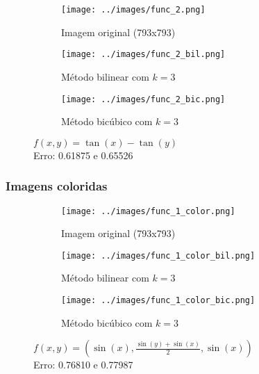 \documentclass[leqno]{article}
\begin{document}
\begin{figure}[H]
    \centering
    \begin{subfigure}{.33\textwidth}
      \centering
      \texttt{[image: ../images/func\_2.png]}
      \caption{Imagem original  (793x793) }
      \label{fig:sub1}
    \end{subfigure}%
    \begin{subfigure}{.33\textwidth}
      \centering
      \texttt{[image: ../images/func\_2\_bil.png]}
      \caption{Método bilinear com $k = 3$}
      \label{fig:sub2}
    \end{subfigure}
    \begin{subfigure}{.33\textwidth}
        \centering
        \texttt{[image: ../images/func\_2\_bic.png]}
        \caption{Método bicúbico com $k = 3$}
        \label{fig:sub1}
      \end{subfigure}%
    \caption{$f(x,y) = \tan(x) - \tan(y)$ \\ Erro: 0.61875 e 0.65526}
    \label{fig:test}
\end{figure}

\subsubsection*{Imagens coloridas}

\begin{figure}[H]
    \centering
    \begin{subfigure}{.33\textwidth}
      \centering
      \texttt{[image: ../images/func\_1\_color.png]}
      \caption{Imagem original  (793x793) }
      \label{fig:sub1}
    \end{subfigure}%
    \begin{subfigure}{.33\textwidth}
      \centering
      \texttt{[image: ../images/func\_1\_color\_bil.png]}
      \caption{Método bilinear com $k = 3$}
      \label{fig:sub2}
    \end{subfigure}
    \begin{subfigure}{.33\textwidth}
        \centering
        \texttt{[image: ../images/func\_1\_color\_bic.png]}
        \caption{Método bicúbico com $k = 3$}
        \label{fig:sub1}
      \end{subfigure}%
    \caption{$f(x,y) = (\sin(x), \frac{\sin(y) + \sin(x)}{2}, \sin(x))$ \\ Erro: 0.76810 e 0.77987}
    \label{fig:test}
\end{figure}
\end{document}
